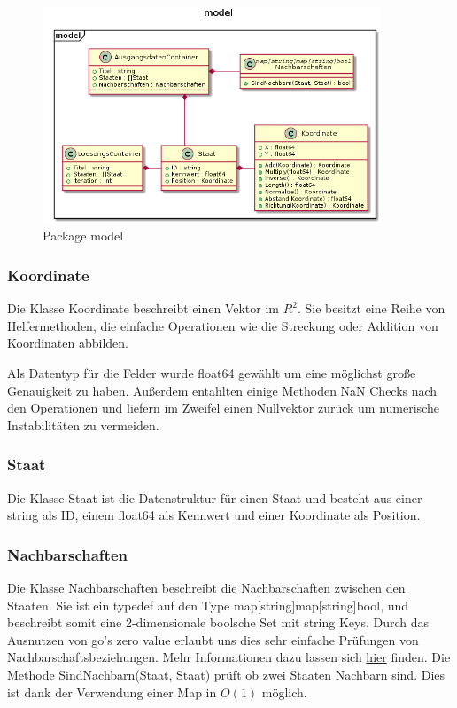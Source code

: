\begin{figure}[ht]
    \centering
    \includegraphics[width=0.9\textwidth,]{model.png}
    \caption[]{Package model}
\end{figure}

\subsubsection{Koordinate}

Die Klasse Koordinate beschreibt einen Vektor im $ R^2 $.
Sie besitzt eine  Reihe von Helfermethoden, die einfache Operationen wie die Streckung oder Addition von Koordinaten abbilden.

Als Datentyp für die Felder wurde float64 gewählt um eine möglichst große Genauigkeit zu haben.
Außerdem entahlten einige Methoden NaN Checks nach den Operationen und liefern im Zweifel einen Nullvektor zurück um numerische Instabilitäten zu vermeiden.

\subsubsection{Staat}

Die Klasse Staat ist die Datenstruktur für einen Staat und besteht aus einer string als ID, einem float64 als Kennwert und einer Koordinate als Position.


\subsubsection{Nachbarschaften}

Die Klasse Nachbarschaften beschreibt die Nachbarschaften zwischen den Staaten.
Sie ist ein typedef auf den Type map[string]map[string]bool, und beschreibt somit eine 2-dimensionale boolsche Set mit string Keys.
Durch das Ausnutzen von go's zero value erlaubt uns dies sehr einfache Prüfungen von Nachbarschaftsbeziehungen.
Mehr Informationen dazu lassen sich \href{https://blog.golang.org/go-maps-in-action}{hier} finden.
Die Methode SindNachbarn(Staat, Staat) prüft ob zwei Staaten Nachbarn sind. Dies ist dank der Verwendung einer Map in $ O(1) $ möglich.

